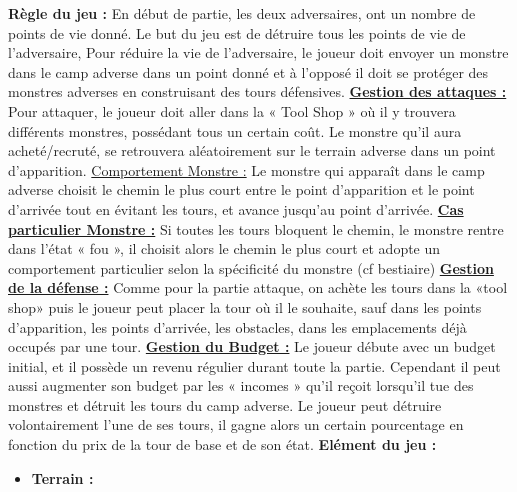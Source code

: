 \documentclass[12pt, letterpaper]{article}
\begin{document}
{\textbf{\Large{Règle du jeu :}} \newline \newline
En début de partie, les deux adversaires, ont un nombre de points de vie donné. Le but du jeu est de détruire tous les points de vie de l’adversaire, Pour réduire la vie de l'adversaire, le joueur doit envoyer un monstre dans le camp adverse dans un point donné et à l'opposé il doit se protéger des monstres adverses en construisant des tours défensives.
\newline
\textbf{\underline{Gestion des attaques :}}
Pour attaquer, le joueur doit aller dans la « Tool Shop » où il y trouvera différents monstres, possédant tous un certain coût. Le monstre qu’il aura acheté/recruté, se retrouvera aléatoirement sur le terrain adverse dans un point d’apparition. \newline
\underline{Comportement Monstre :}
Le monstre qui apparaît dans le camp adverse choisit le chemin le plus court entre le point d’apparition et le point d’arrivée tout en évitant les tours, et avance jusqu’au point d’arrivée. \newline
\clearpage
\BgThispage
\noindent \textbf{\underline{Cas particulier Monstre :}}
Si toutes les tours bloquent le chemin, le monstre rentre dans l’état « fou », il choisit alors le chemin le plus court et adopte un comportement particulier selon la spécificité du monstre (cf bestiaire)\newline
\textbf{\underline{Gestion de la défense :}}
Comme pour la partie attaque, on achète les tours dans la «tool shop» puis le joueur peut placer la tour où il le souhaite, sauf dans les points d’apparition, les points d’arrivée, les obstacles, dans les emplacements déjà occupés par une tour.\newline
\textbf{\underline{Gestion du Budget :}}\newline
Le joueur débute avec un budget initial, et il possède un revenu régulier durant toute la partie. Cependant il peut aussi augmenter son budget par les « incomes » qu’il reçoit lorsqu’il tue des monstres et détruit les tours du camp adverse.  Le joueur peut détruire volontairement l’une de ses tours, il gagne alors un certain pourcentage en fonction du prix de la tour de base et de son état.
\newline
\newline
\textbf{\Large{Elément du jeu :}}

\begin{itemize}
\item
    \textbf{Terrain :}


\end{itemize}}
\end{document}
